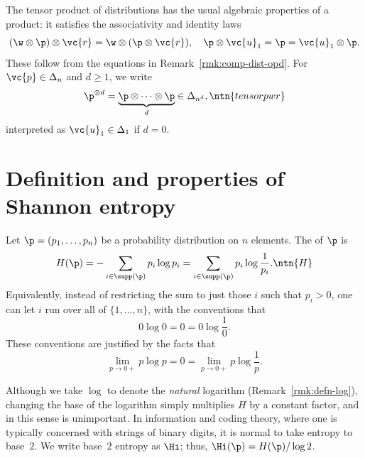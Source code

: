 The tensor product of distributions has the usual algebraic properties of a
product: it satisfies the associativity%
%
%
%  
and identity laws
\[
(\w \otimes \p) \otimes \vc{r}
=
\w \otimes (\p \otimes \vc{r}),
\quad
\p \otimes \vc{u}_1 = \p = \vc{u}_1 \otimes \p.
\]
These follow from the equations in Remark~\ref{rmk:comp-dist-opd}.  For
$\vc{p} \in \Delta_n$ and $d \geq 1$, we write 
\[
\p^{\otimes d} 
= 
\underbrace{\p \otimes \cdots \otimes \p}_d
\in
\Delta_{n^d},
\ntn{tensorpwr}
\]
interpreted as $\vc{u}_1 \in \Delta_1$ if $d = 0$.


\section{Definition and properties of Shannon entropy}


Let $\p = (p_1, \ldots, p_n)$ be a probability distribution on $n$
elements.  The  of $\p$ is 
\[
H(\p)
=
- \sum_{i \in \supp(\p)} p_i \log p_i
=
\sum_{i \in \supp(\p)} p_i \log \frac{1}{p_i}.
\ntn{H}
\]
Equivalently, instead of restricting the sum to just those $i$ such that
$p_i > 0$, one can let $i$ run over all of $\{1, \ldots, n\}$, with the
conventions that
\[
0 \log 0 = 0 = 0 \log \frac{1}{0}.
\]
These conventions are justified by the facts that
\[
\lim_{p \to {0+}} p \log p
=
0
=
\lim_{p \to {0+}} p \log \frac{1}{p}.
\]

\begin{remark}
Although we take $\log$ to denote the \emph{natural} logarithm
(Remark~\ref{rmk:defn-log}), changing the base of the logarithm simply
multiplies $H$ by a constant factor, and in this sense is unimportant.  In
information and coding theory, where one is typically concerned with
strings of binary digits, it is normal to take entropy to base~$2$.  We
write base~$2$%
%
% 
entropy as $\Hi$; thus, $\Hi(\p) = H(\p)/\log 2$.
\end{remark}

